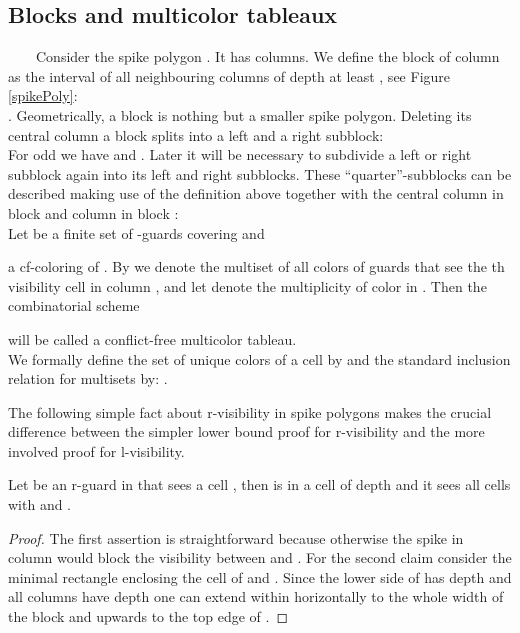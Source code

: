 \documentclass[a4paper,USenglish,numberwithinsect]{lipics}
\theoremstyle{plain}
\begin{document}
 
 
\subsection{Blocks and multicolor tableaux}
\ \ \ \ Consider the spike polygon . It has  columns.
We define the block  of column  as the interval
of all neighbouring columns of depth at least , see Figure \ref{spikePoly}: \\
 . Geometrically, a block is nothing but a smaller spike polygon. Deleting its central column a block splits into a left and a right subblock: \\

For odd  we have  and .
Later  it will be necessary to subdivide a left
or right subblock again into
its left and right subblocks. These ``quarter''-subblocks can be described
making use of the definition above
together with the central column  in block
 and column
 in  block :\\



Let  be a finite set of -guards covering  and

a cf-coloring of  . By   we denote the  multiset of
all colors of guards that see the th
visibility cell  in column , and let  denote the
multiplicity of color  in  .
Then the  combinatorial scheme

will be called a conflict-free multicolor tableau.
\\
We
formally define   the set of unique colors of a cell by  and the  standard inclusion relation  for multisets  by:
              .

The following simple fact  about r-visibility in spike polygons
makes  the crucial difference between
the simpler lower bound  proof for
r-visibility and the more involved proof for l-visibility.


\begin{lemma}
\label{rVis}
Let  be an r-guard in  that sees a cell ,
then  is  in a cell of depth 
and it sees all cells  with
 and .
\end{lemma}
\begin{proof}
The first assertion is straightforward because otherwise the spike in
column  would block
the visibility between  and . For the second claim
consider the minimal rectangle  enclosing the cell of  and 
. Since the lower
side of  has depth   and all columns  have
depth  
one can extend  within  horizontally to the whole width of the
block 
and upwards to the top edge of .
\end{proof}
\end{document}

